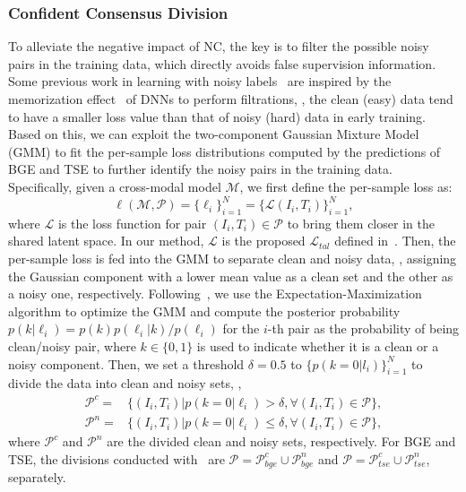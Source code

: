 \documentclass[10pt,twocolumn,letterpaper]{article}
\begin{document}
\subsubsection{Confident Consensus Division}
To alleviate the negative impact of NC, the key is to filter the possible noisy pairs in the training data, which directly avoids false supervision information. Some previous work in learning with noisy labels~\cite{han2018co,li2020dividemix,huang2021learning} are inspired by the memorization effect~\cite{arpit2017closer} of DNNs to perform filtrations, \ie, the clean (easy) data tend to have a smaller loss value than that of noisy (hard) data in early training. Based on this, we can exploit the two-component Gaussian Mixture Model (GMM) to fit the per-sample loss distributions computed by the predictions of BGE and TSE to further identify the noisy pairs in the training data. Specifically, given a cross-modal model $\mathcal{M}$, we first define the per-sample loss as:
\begin{equation}
    \ell(\mathcal{M},\mathcal{P}) = \{\ell_i\}^N_{i=1}= \big\{\mathcal{L}(I_i,T_i)\big\}^N_{i=1},
\end{equation}
where $\mathcal{L}$ is the loss function for pair $(I_i,T_i)\in\mathcal{P}$ to bring them closer in the shared latent space. In our method, $\mathcal{L}$ is the proposed $\mathcal{L}_{tal}$ defined in~. Then, the per-sample loss is fed into the GMM to separate clean and noisy data, \ie, assigning the Gaussian component with a lower mean value as a clean set and the other as a noisy one, respectively. Following~\cite{li2020dividemix,huang2021learning}, we use the Expectation-Maximization algorithm to optimize the GMM and compute the posterior probability $p(k|\ell_i)=p(k)p(\ell_i|k)/p(\ell_i)$ for the $i$-th pair as the probability of being clean/noisy pair, where $k\in\{0,1\}$ is used to indicate whether it is a clean or a noisy component. 
Then, we set a threshold $\delta=0.5$ to $\{p(k=0|l_i)\}^N_{i=1}$ to divide the data into clean and noisy sets, \ie,
\begin{equation} 
\begin{aligned}
        \mathcal{P}^c=&\{(I_i,T_i)|p(k=0|\ell_i)>\delta,\forall (I_i,T_i)\in\mathcal{P} \},\\
        \mathcal{P}^n=&\{(I_i,T_i)|p(k=0|\ell_i)\leq \delta,\forall (I_i,T_i)\in\mathcal{P} \},
\end{aligned}
\label{eq3}
\end{equation}
where $\mathcal{P}^c$ and $\mathcal{P}^n$ are the divided clean and noisy sets, respectively. For BGE and TSE, the divisions conducted with~ are $\mathcal{P} = \mathcal{P}^c_{bge}\cup \mathcal{P}^n_{bge}$ and $\mathcal{P} = \mathcal{P}^c_{tse}\cup \mathcal{P}^n_{tse}$, separately.
\end{document}
